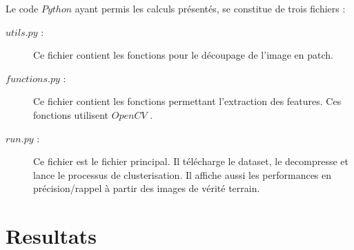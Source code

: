 \documentclass{book}
\begin{document}
Le code $Python$ ayant permis les calculs présentés, se constitue de trois fichiers :
\begin{description} %

\item[$utils.py$ :] Ce fichier contient les fonctions pour le découpage de l'image en patch.
\item[$functions.py$ :] Ce fichier contient les fonctions permettant l'extraction des features. Ces fonctions utilisent $OpenCV$ \cite{opencv_library}.
\item[$run.py$ :] Ce fichier est le fichier principal. Il télécharge le dataset, le decompresse et lance le processus de clusterisation. Il affiche aussi les performances
en précision/rappel à partir des images de vérité terrain.

\end{description}


\chapter{Resultats}

\clearpage

\appendix
\end{document}
